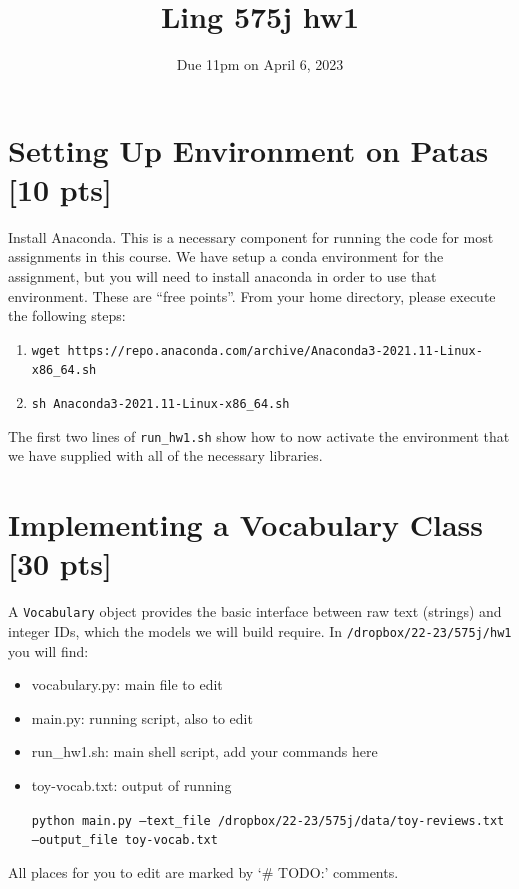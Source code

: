 \documentclass[11pt]{article}
\begin{document}
\title{Ling 575j hw1}
\date{\vspace{-0.2in}Due 11pm on April 6, 2023}
\maketitle


\section{Setting Up Environment on Patas [10 pts]}

Install Anaconda. This is a necessary component for running the code for most assignments in this course.  We have setup a conda environment for the assignment, but you will need to install anaconda in order to use that environment.  These are ``free points''.  From your home directory, please execute the following steps:
\begin{enumerate}
	\item \texttt{wget https://repo.anaconda.com/archive/Anaconda3-2021.11-Linux-x86\_64.sh}
	\item \texttt{sh Anaconda3-2021.11-Linux-x86\_64.sh}
\end{enumerate}
The first two lines of \texttt{run\_hw1.sh} show how to now activate the environment that we have supplied with all of the necessary libraries.


\section{Implementing a Vocabulary Class [30 pts]}

A \texttt{Vocabulary} object provides the basic interface between raw text (strings) and integer IDs, which the models we will build require.  In \texttt{/dropbox/22-23/575j/hw1} you will find:
\begin{itemize}
  \item vocabulary.py: main file to edit
  \item main.py: running script, also to edit
  \item run\_hw1.sh: main shell script, add your commands here
  \item toy-vocab.txt: output of running 
  
    \texttt{python main.py --text\_file /dropbox/22-23/575j/data/toy-reviews.txt \\--output\_file toy-vocab.txt}
\end{itemize}
All places for you to edit are marked by `\# TODO:' comments.
\end{document}
